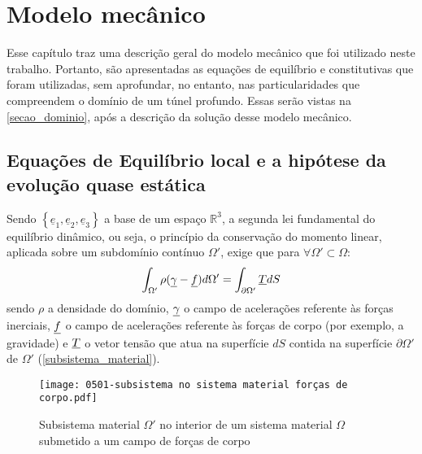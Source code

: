 \chapter{Modelo mecânico}
\label{cap: modelo mecanico}

Esse capítulo traz uma descrição geral do modelo mecânico que foi utilizado neste trabalho. Portanto, são apresentadas as equações de equilíbrio e constitutivas que foram utilizadas, sem aprofundar, no entanto, nas particularidades que compreendem o domínio de um túnel profundo. Essas serão vistas na \autoref{secao_dominio}, após a descrição da solução desse modelo mecânico. 

\section{Equações de Equilíbrio local e a hipótese da evolução quase estática}

Sendo $\left\{\underline{e}_1,\underline{e}_2,\underline{e}_3\right\}$ a base de um espaço $\mathbb{R}^3$, a segunda lei fundamental do equilíbrio dinâmico, ou seja, o princípio da conservação do momento linear, aplicada sobre um subdomínio contínuo $\Omega'$, exige que para $\forall \Omega' \subset \Omega$:
\begin{equation}
	\label{eq:conservacao_momento_linear}
\int_{\Omega'}\rho(\underline \gamma-\underline f)d\Omega' = \int_{\partial\Omega'}\underline T dS
\end{equation}
sendo $\rho$ a densidade do domínio, $\underline \gamma$ o campo de acelerações referente às forças inerciais, $\underline f$ o campo de acelerações referente às forças de corpo (por exemplo, a gravidade) e $\underline T$ o vetor tensão que atua na superfície $dS$ contida na superfície $\partial\Omega'$ de $\Omega'$ (\autoref{subsistema_material}).

\begin{figure}[H]
	\begin{center}
		\texttt{[image: 0501-subsistema no sistema material forças de corpo.pdf]}
	\end{center}
	\caption{\label{subsistema_material}Subsistema material $\Omega'$ no interior de um sistema material $\Omega$ submetido a um campo de forças de corpo}
\end{figure}

